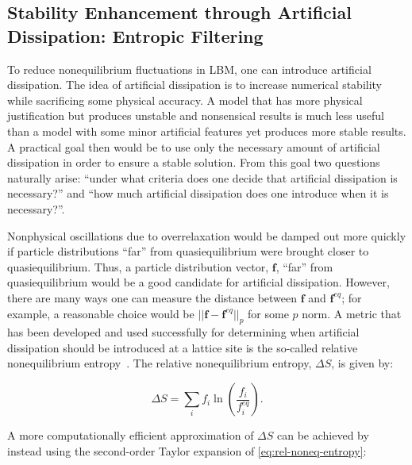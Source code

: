 \subsection{Stability Enhancement through Artificial Dissipation: Entropic Filtering}

To reduce nonequilibrium fluctuations in LBM, one can introduce artificial dissipation.
The idea of artificial dissipation is to increase numerical stability while sacrificing some physical accuracy.
A model that has more physical justification but produces unstable and nonsensical results is much less useful than a model with some minor artificial features yet produces more stable results.
A practical goal then would be to use only the necessary amount of artificial dissipation in order to ensure a stable solution.
From this goal two questions naturally arise: ``under what criteria does one decide that artificial dissipation is necessary?'' and ``how much artificial dissipation does one introduce when it is necessary?''.

Nonphysical oscillations due to overrelaxation would be damped out more quickly if particle distributions ``far'' from quasiequilibrium were brought closer to quasiequilibrium.
Thus, a particle distribution vector, $\mathbf{f}$, ``far'' from quasiequilibrium would be a good candidate for artificial dissipation.
However, there are many ways one can measure the distance between $\mathbf{f}$ and $\mathbf{f}^{eq}$; for example, a reasonable choice would be $||\mathbf{f} - \mathbf{f}^{eq}||_p$ for some $p$ norm.
A metric that has been developed and used successfully for determining when artificial dissipation should be introduced at a lattice site is the so-called relative nonequilibrium entropy~\cite{gorban2014enhancement,brownlee2006stabilization,brownlee2007stability,brownlee2008nonequilibrium,packwood2009entropy}.
The relative nonequilibrium entropy, $\Delta S$, is given by:

\begin{equation} \label{eq:rel-noneq-entropy}
\Delta S = \sum_i f_i \ln(\frac{f_i}{f^{eq}_i}).
\end{equation}

\noindent A more computationally efficient approximation of $\Delta S$ can be achieved by instead using the second-order Taylor expansion of \eqref{eq:rel-noneq-entropy}:

